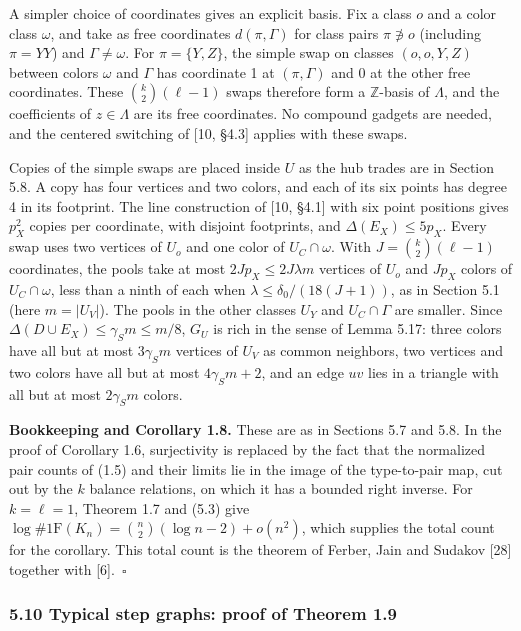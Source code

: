\documentclass[english,11pt,a4paper]{article}
\begin{document}
A simpler choice of coordinates gives an explicit basis. Fix a class \(o\) and a color class \(\omega\), and take as free coordinates \(d(\pi,\Gamma)\) for class pairs \(\pi\not\ni o\) (including \(\pi=YY\)) and \(\Gamma\ne\omega\). For \(\pi=\{Y,Z\}\), the simple swap on classes \((o,o,Y,Z)\) between colors \(\omega\) and \(\Gamma\) has coordinate 1 at \((\pi,\Gamma)\) and 0 at the other free coordinates. These \(\binom{k}{2}(\ell-1)\) swaps therefore form a \(\mathbb Z\)-basis of \(\Lambda\), and the coefficients of \(z\in\Lambda\) are its free coordinates. No compound gadgets are needed, and the centered switching of {[}10, §4.3{]} applies with these swaps.

Copies of the simple swaps are placed inside \(U\) as the hub trades are in Section 5.8. A copy has four vertices and two colors, and each of its six points has degree 4 in its footprint. The line construction of {[}10, §4.1{]} with six point positions gives \(p_X^2\) copies per coordinate, with disjoint footprints, and \(\Delta(E_X)\le5p_X\). Every swap uses two vertices of \(U_o\) and one color of \(U_C\cap\omega\). With \(J=\binom{k}{2}(\ell-1)\) coordinates, the pools take at most \(2Jp_X\le2J\lambda m\) vertices of \(U_o\) and \(Jp_X\) colors of \(U_C\cap\omega\), less than a ninth of each when \(\lambda\le\delta_0/(18(J+1))\), as in Section 5.1 (here \(m=|U_V|\)). The pools in the other classes \(U_Y\) and \(U_C\cap\Gamma\) are smaller. Since \(\Delta(D\cup E_X)\le\gamma_Sm\le m/8\), \(G_U\) is rich in the sense of Lemma 5.17: three colors have all but at most \(3\gamma_Sm\) vertices of \(U_V\) as common neighbors, two vertices and two colors have all but at most \(4\gamma_Sm+2\), and an edge \(uv\) lies in a triangle with all but at most \(2\gamma_Sm\) colors.

\textbf{Bookkeeping and Corollary 1.8.} These are as in Sections 5.7 and 5.8. In the proof of Corollary 1.6, surjectivity is replaced by the fact that the normalized pair counts of (1.5) and their limits lie in the image of the type-to-pair map, cut out by the \(k\) balance relations, on which it has a bounded right inverse. For \(k=\ell=1\), Theorem 1.7 and (5.3) give \(\log\#\mathrm{1F}(K_n)=\binom{n}{2}(\log n-2)+o(n^2)\), which supplies the total count for the corollary. This total count is the theorem of Ferber, Jain and Sudakov {[}28{]} together with {[}6{]}.~\(\square\)

\subsubsection{5.10 Typical step graphs: proof of Theorem 1.9}\label{typical-step-graphs-proof-of-theorem-1.9}
\end{document}
